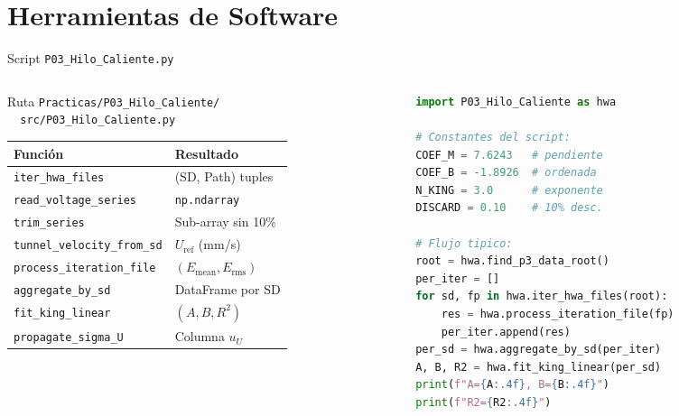 \documentclass[aspectratio=169,12pt]{beamer}
\begin{document}
\section{Herramientas de Software}

\begin{frame}[fragile]{Script \texttt{P03\_Hilo\_Caliente.py}}
	\begin{columns}
		\begin{column}{0.5\textwidth}
			\begin{block}{Ruta}
				\scriptsize
				\texttt{Practicas/P03\_Hilo\_Caliente/}\\
				\texttt{\ \ src/P03\_Hilo\_Caliente.py}
			\end{block}
			\vspace{0.2em}
			\scriptsize
			\begin{tabular}{ll}
				\toprule
				\textbf{Función}
				 & \textbf{Resultado}                  \\
				\midrule
				\texttt{iter\_hwa\_files}
				 & (SD, Path) tuples                   \\
				\texttt{read\_voltage\_series}
				 & \texttt{np.ndarray}                 \\
				\texttt{trim\_series}
				 & Sub-array sin 10\%                  \\
				\texttt{tunnel\_velocity\_from\_sd}
				 & $U_\mathrm{ref}$ (mm/s)             \\
				\texttt{process\_iteration\_file}
				 & $(E_\mathrm{mean}, E_\mathrm{rms})$ \\
				\texttt{aggregate\_by\_sd}
				 & DataFrame por SD                    \\
				\texttt{fit\_king\_linear}
				 & $(A, B, R^2)$                       \\
				\texttt{propagate\_sigma\_U}
				 & Columna $u_U$                       \\
				\bottomrule
			\end{tabular}
		\end{column}
		\begin{column}{0.47\textwidth}
			\begin{lstlisting}[language=Python]
import P03_Hilo_Caliente as hwa

# Constantes del script:
COEF_M = 7.6243   # pendiente
COEF_B = -1.8926  # ordenada
N_KING = 3.0      # exponente
DISCARD = 0.10    # 10% desc.

# Flujo tipico:
root = hwa.find_p3_data_root()
per_iter = []
for sd, fp in hwa.iter_hwa_files(root):
    res = hwa.process_iteration_file(fp)
    per_iter.append(res)
per_sd = hwa.aggregate_by_sd(per_iter)
A, B, R2 = hwa.fit_king_linear(per_sd)
print(f"A={A:.4f}, B={B:.4f}")
print(f"R2={R2:.4f}")
      \end{lstlisting}
		\end{column}
	\end{columns}
\end{frame}
\end{document}
